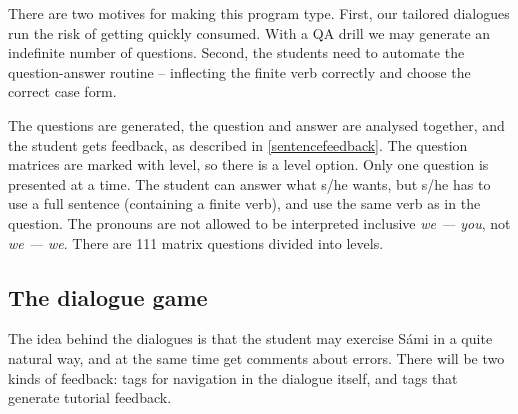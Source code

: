 \documentclass[11pt]{article}
\begin{document}
There are two motives for making this program type. First, our tailored dialogues 
run the risk of getting quickly consumed. With a QA drill we may generate an indefinite number of questions. Second, the students need to automate the question-answer routine -- inflecting the finite verb correctly and choose the correct case form.

The questions are generated, the question and answer are analysed together, and the student gets feedback, as described in \ref{sentencefeedback}. The question matrices are marked with level, so there is a level option. Only one question is presented at a time. The student can answer what s/he wants, but s/he has to use a full sentence (containing a finite verb), and use the same verb as in the question. The pronouns are not allowed to be interpreted inclusive \textit{we — you}, not \textit{we — we}. There are 111 matrix questions divided into levels.



	

\subsection{The dialogue game}
The idea behind the dialogues is that the student may exercise Sámi in a quite natural way, and at the same time get comments about errors. There will be two kinds of feedback: tags for navigation in the dialogue itself, and tags that generate tutorial feedback.
\end{document}
